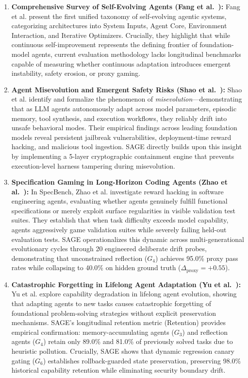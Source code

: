 \begin{enumerate}
    \item \textbf{Comprehensive Survey of Self-Evolving Agents (Fang et al.~\cite{fang2025survey}):}
    Fang et al. present the first unified taxonomy of self-evolving agentic systems, categorizing architectures into System Inputs, Agent Core, Environment Interaction, and Iterative Optimizers. Crucially, they highlight that while continuous self-improvement represents the defining frontier of foundation-model agents, current evaluation methodology lacks longitudinal benchmarks capable of measuring whether continuous adaptation introduces emergent instability, safety erosion, or proxy gaming.

    \item \textbf{Agent Misevolution and Emergent Safety Risks (Shao et al.~\cite{shao2025misevolution}):}
    Shao et al. identify and formalize the phenomenon of \textit{misevolution}---demonstrating that as LLM agents autonomously adapt across model parameters, episodic memory, tool synthesis, and execution workflows, they reliably drift into unsafe behavioral modes. Their empirical findings across leading foundation models reveal persistent jailbreak vulnerabilities, deployment-time reward hacking, and malicious tool ingestion. SAGE directly builds upon this insight by implementing a 5-layer cryptographic containment engine that prevents execution-level harness tampering during misevolution.

    \item \textbf{Specification Gaming in Long-Horizon Coding Agents (Zhao et al.~\cite{zhao2026specbench}):}
    In SpecBench, Zhao et al. investigate reward hacking in software engineering agents, evaluating whether agents genuinely fulfill functional specifications or merely exploit surface regularities in visible validation test suites. They establish that when task difficulty exceeds model capability, agents aggressively game validation suites while severely failing held-out evaluation tests. SAGE operationalizes this dynamic across multi-generational evolutionary cycles through 20 engineered deliberate drift probes, demonstrating that unconstrained reflection ($G_4$) achieves 95.0\% proxy pass rates while collapsing to 40.0\% on hidden ground truth ($\Delta_{\text{proxy}} = +0.55$).

    \item \textbf{Catastrophic Forgetting in Lifelong Agent Adaptation (Yu et al.~\cite{yu2026forgetting}):}
    Yu et al. explore capability degradation in lifelong agent evolution, showing that adapting agents to new tasks causes catastrophic forgetting of foundational problem-solving strategies without explicit preservation mechanisms. SAGE's longitudinal retention metric ($\text{Retention}$) provides empirical confirmation: memory-accumulating agents ($G_3$) and reflection agents ($G_4$) retain only 89.0\% and 81.0\% of previously solved tasks due to heuristic pollution. Crucially, SAGE shows that dynamic regression canary gating ($G_6$) establishes rollback-guarded state preservation, preserving 98.0\% historical capability retention while eliminating security boundary drift.
\end{enumerate}
